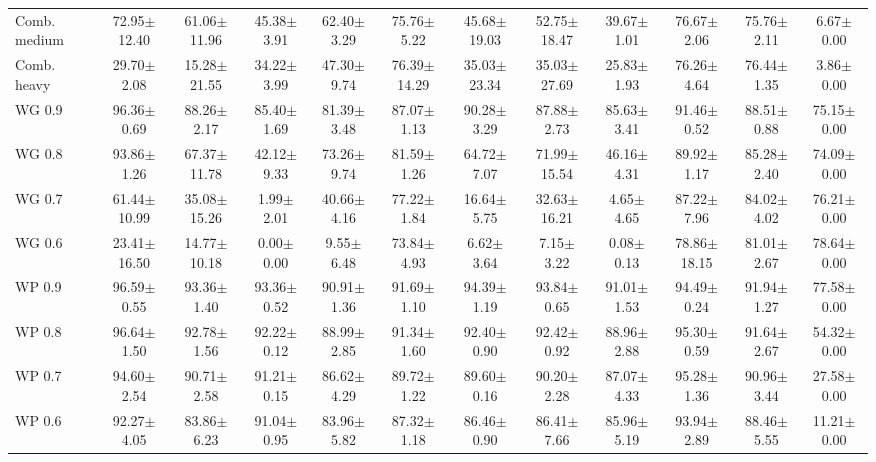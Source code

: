 \begin{table}[!t]
{\begin{tabular}{lccccccccccc}
Comb. medium & 72.95$\pm$12.40 & 61.06$\pm$11.96 & 45.38$\pm$3.91 & 62.40$\pm$3.29 & 75.76$\pm$5.22 & 45.68$\pm$19.03 & 52.75$\pm$18.47 & 39.67$\pm$1.01 & 76.67$\pm$2.06 & 75.76$\pm$2.11 & 6.67$\pm$0.00 \\
Comb. heavy & 29.70$\pm$2.08 & 15.28$\pm$21.55 & 34.22$\pm$3.99 & 47.30$\pm$9.74 & 76.39$\pm$14.29 & 35.03$\pm$23.34 & 35.03$\pm$27.69 & 25.83$\pm$1.93 & 76.26$\pm$4.64 & 76.44$\pm$1.35 & 3.86$\pm$0.00 \\
WG 0.9 & 96.36$\pm$0.69 & 88.26$\pm$2.17 & 85.40$\pm$1.69 & 81.39$\pm$3.48 & 87.07$\pm$1.13 & 90.28$\pm$3.29 & 87.88$\pm$2.73 & 85.63$\pm$3.41 & 91.46$\pm$0.52 & 88.51$\pm$0.88 & 75.15$\pm$0.00 \\
WG 0.8 & 93.86$\pm$1.26 & 67.37$\pm$11.78 & 42.12$\pm$9.33 & 73.26$\pm$9.74 & 81.59$\pm$1.26 & 64.72$\pm$7.07 & 71.99$\pm$15.54 & 46.16$\pm$4.31 & 89.92$\pm$1.17 & 85.28$\pm$2.40 & 74.09$\pm$0.00 \\
WG 0.7 & 61.44$\pm$10.99 & 35.08$\pm$15.26 & 1.99$\pm$2.01 & 40.66$\pm$4.16 & 77.22$\pm$1.84 & 16.64$\pm$5.75 & 32.63$\pm$16.21 & 4.65$\pm$4.65 & 87.22$\pm$7.96 & 84.02$\pm$4.02 & 76.21$\pm$0.00 \\
WG 0.6 & 23.41$\pm$16.50 & 14.77$\pm$10.18 & 0.00$\pm$0.00 & 9.55$\pm$6.48 & 73.84$\pm$4.93 & 6.62$\pm$3.64 & 7.15$\pm$3.22 & 0.08$\pm$0.13 & 78.86$\pm$18.15 & 81.01$\pm$2.67 & 78.64$\pm$0.00 \\
WP 0.9 & 96.59$\pm$0.55 & 93.36$\pm$1.40 & 93.36$\pm$0.52 & 90.91$\pm$1.36 & 91.69$\pm$1.10 & 94.39$\pm$1.19 & 93.84$\pm$0.65 & 91.01$\pm$1.53 & 94.49$\pm$0.24 & 91.94$\pm$1.27 & 77.58$\pm$0.00 \\
WP 0.8 & 96.64$\pm$1.50 & 92.78$\pm$1.56 & 92.22$\pm$0.12 & 88.99$\pm$2.85 & 91.34$\pm$1.60 & 92.40$\pm$0.90 & 92.42$\pm$0.92 & 88.96$\pm$2.88 & 95.30$\pm$0.59 & 91.64$\pm$2.67 & 54.32$\pm$0.00 \\
WP 0.7 & 94.60$\pm$2.54 & 90.71$\pm$2.58 & 91.21$\pm$0.15 & 86.62$\pm$4.29 & 89.72$\pm$1.22 & 89.60$\pm$0.16 & 90.20$\pm$2.28 & 87.07$\pm$4.33 & 95.28$\pm$1.36 & 90.96$\pm$3.44 & 27.58$\pm$0.00 \\
WP 0.6 & 92.27$\pm$4.05 & 83.86$\pm$6.23 & 91.04$\pm$0.95 & 83.96$\pm$5.82 & 87.32$\pm$1.18 & 86.46$\pm$0.90 & 86.41$\pm$7.66 & 85.96$\pm$5.19 & 93.94$\pm$2.89 & 88.46$\pm$5.55 & 11.21$\pm$0.00 \\
\hline
\end{tabular}}
\end{table}
